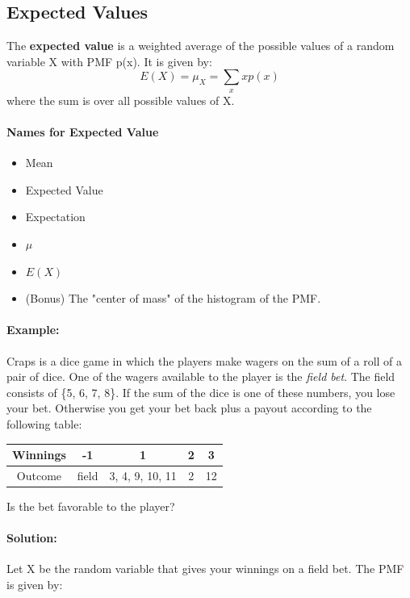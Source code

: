 \subsection{Expected Values}
\hrulefill
\vspace{5mm}

The \textbf{expected value} is a weighted average of the possible values of a random variable X with PMF p(x).
It is given by:
\[
    E(X) = \mu_X = \sum_x x p(x)
\]
where the sum is over all possible values of X.

\paragraph*{Names for Expected Value}
\begin{itemize}
    \item Mean
    \item Expected Value
    \item Expectation
    \item $\mu$
    \item $E(X)$
    \item (Bonus) The "center of mass" of the histogram of the PMF.
\end{itemize}

\paragraph*{Example:}
Craps is a dice game in which the players make wagers on the sum of a roll of a pair of dice. One of the wagers 
available to the player is the \textit{field bet}. The field consists of \{5, 6, 7, 8\}. If the sum of the dice is one of these
numbers, you lose your bet. Otherwise you get your bet back plus a payout according to the following table:

\begin{table}[h!]
    \centering
    \begin{tabular}{c|c|c|c|c}
        Winnings & -1 & 1 & 2 & 3 \\
        \hline
        Outcome & field & {3, 4, 9, 10, 11} & 2 & 12 \\
    \end{tabular}
\end{table}

Is the bet favorable to the player?

\paragraph*{Solution:}
Let X be the random variable that gives your winnings on a field bet. The PMF is given by:

